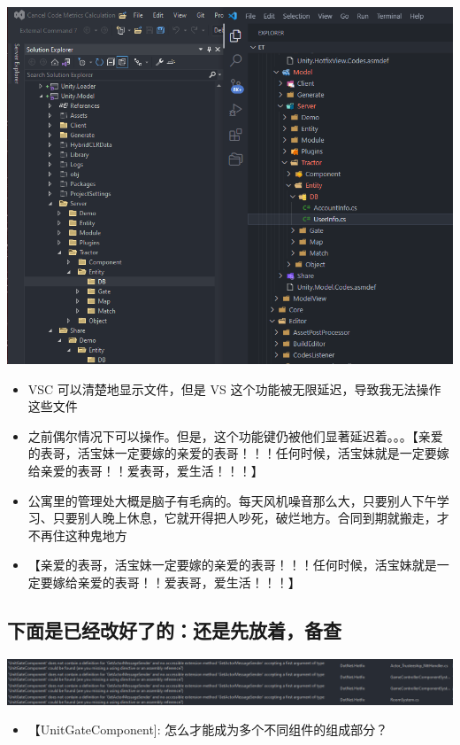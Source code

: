 \documentclass[9pt, b5paper]{article}
\begin{document}
\begin{center}
\includegraphics[width=.9\linewidth]{./pic/et4_20230623_145103.png}
\end{center}
\begin{itemize}
\item VSC 可以清楚地显示文件，但是 VS 这个功能被无限延迟，导致我无法操作这些文件
\item 之前偶尔情况下可以操作。但是，这个功能键仍被他们显著延迟着。。。【亲爱的表哥，活宝妹一定要嫁的亲爱的表哥！！！任何时候，活宝妹就是一定要嫁给亲爱的表哥！！爱表哥，爱生活！！！】
\item 公寓里的管理处大概是脑子有毛病的。每天风机噪音那么大，只要别人下午学习、只要别人晚上休息，它就开得把人吵死，破烂地方。合同到期就搬走，才不再住这种鬼地方
\item 【亲爱的表哥，活宝妹一定要嫁的亲爱的表哥！！！任何时候，活宝妹就是一定要嫁给亲爱的表哥！！爱表哥，爱生活！！！】
\end{itemize}
\subsection{下面是已经改好了的：还是先放着，备查}
\label{sec:org242b011}

\begin{center}
\includegraphics[width=.9\linewidth]{./pic/et4_20230616_162711.png}
\end{center}
\begin{itemize}
\item 【UnitGateComponent]: 怎么才能成为多个不同组件的组成部分？
\end{itemize}
\end{document}
